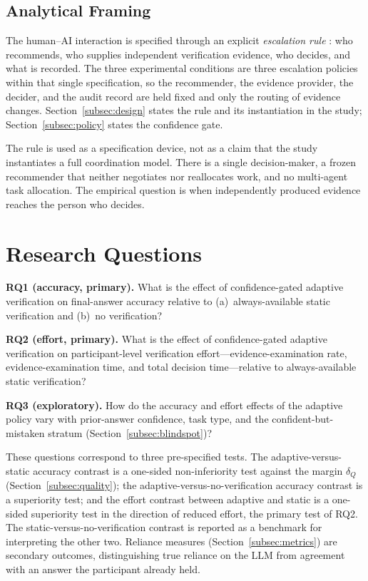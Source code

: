 \documentclass[oneside,final,14pt,a4paper]{extreport}
\begin{document}
\subsection{Analytical Framing}
\label{subsec:framing}

The human--AI interaction is specified through an explicit \emph{escalation
rule} \cite{Ciancarini2027}: who recommends, who supplies independent
verification evidence, who decides, and what is recorded. The three
experimental conditions are three escalation policies within that single
specification, so the recommender, the evidence provider, the decider, and the
audit record are held fixed and only the routing of evidence changes.
Section~\ref{subsec:design} states the rule and its instantiation in the
study; Section~\ref{subsec:policy} states the confidence gate.

The rule is used as a specification device, not as a claim that the study
instantiates a full coordination model. There is a single decision-maker, a
frozen recommender that neither negotiates nor reallocates work, and no
multi-agent task allocation. The empirical question is when independently
produced evidence reaches the person who decides.


\section{Research Questions}


\textbf{RQ1 (accuracy, primary).} What is the effect of confidence-gated
adaptive verification on final-answer accuracy relative to (a)~always-available
static verification and (b)~no verification?

\textbf{RQ2 (effort, primary).} What is the effect of confidence-gated
adaptive verification on participant-level verification
effort---evidence-examination rate,
evidence-examination time, and total decision time---relative to
always-available static verification?

\textbf{RQ3 (exploratory).} How do the accuracy and effort effects of the
adaptive policy vary with prior-answer confidence, task type, and
the confident-but-mistaken stratum (Section~\ref{subsec:blindspot})?

These questions correspond to three pre-specified tests. The adaptive-versus-static
accuracy contrast is a one-sided non-inferiority test against the margin
$\delta_Q$ (Section~\ref{subsec:quality}); the adaptive-versus-no-verification
accuracy contrast is a superiority test; and the effort contrast between
adaptive and static is a one-sided superiority test in the direction of reduced
effort, the primary test of RQ2. The static-versus-no-verification
contrast is reported as a benchmark for interpreting the other two. Reliance
measures (Section~\ref{subsec:metrics}) are secondary outcomes, distinguishing
true reliance on the LLM from agreement with an answer the participant already
held.
\end{document}
